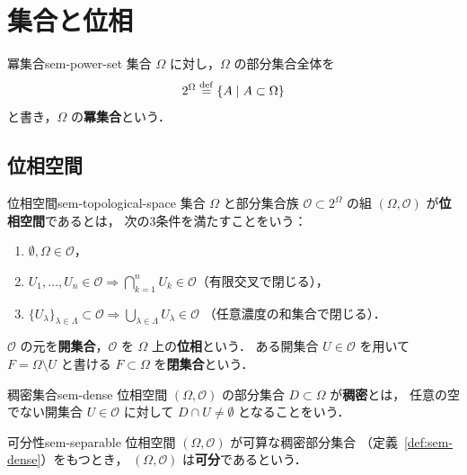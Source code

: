 \chapter{集合と位相}
\label{ch:found-set-topology}

\begin{definition}{冪集合}{sem-power-set}
  集合 $\Omega$ に対し，$\Omega$ の部分集合全体を
  \[
    2^{\Omega} \overset{\mathrm{def}}{=} \{A \mid A \subset \Omega\}
  \]
  と書き，$\Omega$ の\textbf{冪集合}という．
\end{definition}

\section{位相空間}
\label{sec:sem-topology}

\begin{definition}{位相空間}{sem-topological-space}
  集合 $\Omega$ と部分集合族 $\mathcal{O} \subset 2^{\Omega}$ の組
  $(\Omega, \mathcal{O})$ が\textbf{位相空間}であるとは，
  次の3条件を満たすことをいう：
  \begin{enumerate}
    \item[(i)] $\emptyset, \Omega \in \mathcal{O}$，
    \item[(ii)] $U_1, \ldots, U_n \in \mathcal{O} \Longrightarrow
      \bigcap_{k=1}^{n} U_k \in \mathcal{O}$（有限交叉で閉じる），
    \item[(iii)] $\{U_\lambda\}_{\lambda \in \Lambda} \subset \mathcal{O}
      \Longrightarrow \bigcup_{\lambda \in \Lambda} U_\lambda \in \mathcal{O}$
      （任意濃度の和集合で閉じる）．
  \end{enumerate}
  $\mathcal{O}$ の元を\textbf{開集合}，$\mathcal{O}$ を $\Omega$ 上の\textbf{位相}という．
  ある開集合 $U \in \mathcal{O}$ を用いて $F = \Omega \setminus U$ と書ける
  $F \subset \Omega$ を\textbf{閉集合}という．
\end{definition}

\begin{definition}{稠密集合}{sem-dense}
  位相空間 $(\Omega, \mathcal{O})$ の部分集合 $D \subset \Omega$ が\textbf{稠密}とは，
  任意の空でない開集合 $U \in \mathcal{O}$ に対して $D \cap U \neq \emptyset$
  となることをいう．
\end{definition}

\begin{definition}{可分性}{sem-separable}
  位相空間 $(\Omega, \mathcal{O})$ が可算な稠密部分集合
  （定義~\ref{def:sem-dense}）をもつとき，
  $(\Omega, \mathcal{O})$ は\textbf{可分}であるという．
\end{definition}

